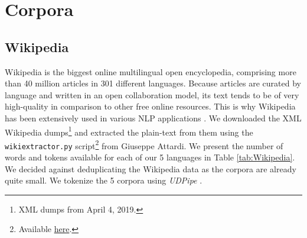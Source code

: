 \section{Corpora}
\subsection{Wikipedia}

\begin{table}[t!]
    \centering\small
    \caption{Size of Wikipedia corpora, measured in bytes, thousands of tokens, words and sentences.}
    \label{tab:Wikipedia}
\end{table}

Wikipedia is the biggest online multilingual open encyclopedia, comprising more than 40 million articles in 301 different languages. Because articles are curated by language and written in an open collaboration model, its text tends to be of very high-quality in comparison to other free online resources. This is why Wikipedia has been extensively used in various NLP applications \citep{wu-weld-2010-open,mihalcea-2007-using,al-rfou-etal-2013-polyglot,bojanowski-etal-2017-enriching}. We downloaded the XML Wikipedia dumps\footnote{XML dumps from April 4, 2019.} and extracted the plain-text from them using the \texttt{wikiextractor.py} script\footnote{Available \href{https://github.com/attardi/wikiextractor}{here}.} from Giuseppe Attardi. We present the number of words and tokens available for each of our 5 languages in Table \ref{tab:Wikipedia}. We decided against deduplicating the Wikipedia data as the corpora are already quite small. We tokenize the 5 corpora using \emph{UDPipe} \citep{straka-strakova-2017-tokenizing}.

